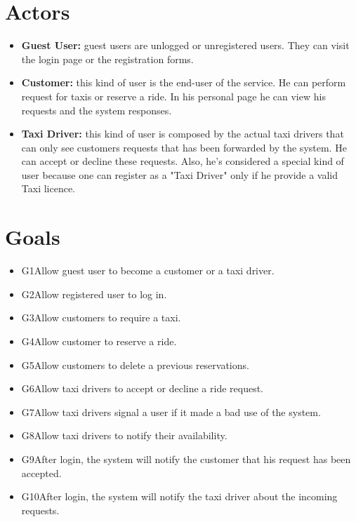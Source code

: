 \documentclass{report}
\begin{document}
	\section{Actors}
		\begin{itemize}
		  \item \textbf{Guest User:}\label{sec:normaluser} guest users are unlogged or unregistered users. They can visit the login page or the registration forms.

		  \item \textbf{Customer:}\label{sec:customer} this kind of user is the end-user of the service. He can perform request for taxis or reserve a ride. In his personal page he can view his requests and the system responses.

		  \item \textbf{Taxi Driver:}\label{sec:tdriver} this kind of user is composed by the actual taxi drivers that can only see customers requests that has been forwarded by the system. He can accept or decline these requests. Also, he's considered a special kind of user because one can register as a "Taxi Driver" only if he provide a valid Taxi licence.
		\end{itemize}
	\section{Goals}
		\begin{itemize}
		\item \lbrack G1\rbrack Allow guest user to become a customer or a taxi driver.

		\item \lbrack G2\rbrack  Allow registered user to log in.

		\item \lbrack G3\rbrack  Allow customers to require a taxi.

		\item \lbrack G4\rbrack  Allow customer to reserve a ride.

		\item \lbrack G5\rbrack  Allow customers to delete a previous reservations.

		\item \lbrack G6\rbrack  Allow taxi drivers to accept or decline a ride request.

		\item \lbrack G7\rbrack Allow taxi drivers signal a user if it made a bad use of the system.

		\item \lbrack G8\rbrack  Allow taxi drivers to notify their availability.

		\item \lbrack G9\rbrack  After login, the system will notify the customer that his request has been accepted.

		\item \lbrack G10\rbrack  After login, the system will notify the taxi driver about the incoming requests.
		\end{itemize}
		
\end{document}

